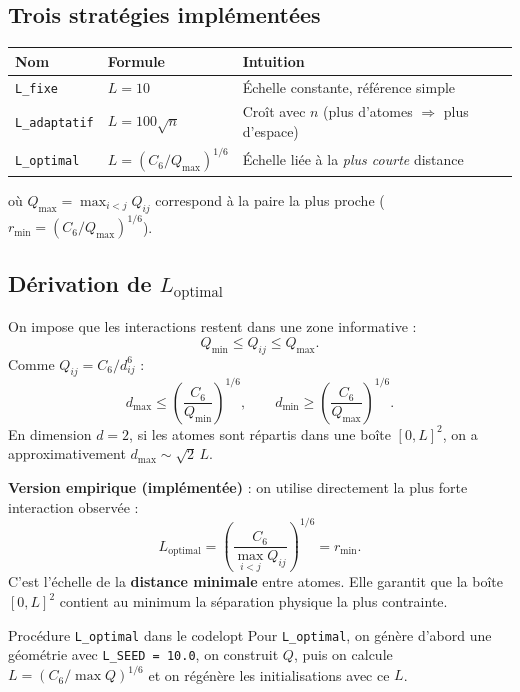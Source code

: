 \documentclass[12pt,a4paper]{article}
\begin{document}
\subsection{Trois stratégies implémentées}

\begin{center}
\begin{tabular}{lll}
  \toprule
  \textbf{Nom} & \textbf{Formule} & \textbf{Intuition} \\
  \midrule
  \texttt{L\_fixe}      & $L = 10$               & Échelle constante, référence simple \\
  \texttt{L\_adaptatif} & $L = 100\sqrt{n}$      & Croît avec $n$ (plus d'atomes $\Rightarrow$ plus d'espace) \\
  \texttt{L\_optimal}   & $L = (C_6/Q_{\max})^{1/6}$ & Échelle liée à la \emph{plus courte} distance \\
  \bottomrule
\end{tabular}
\end{center}

où $Q_{\max} = \max_{i<j} Q_{ij}$ correspond à la paire la plus proche
($r_{\min} = (C_6/Q_{\max})^{1/6}$).

\subsection{Dérivation de $L_{\mathrm{optimal}}$}

On impose que les interactions restent dans une zone informative :
\[
  Q_{\min} \leq Q_{ij} \leq Q_{\max}.
\]
Comme $Q_{ij} = C_6/d_{ij}^6$ :
\[
  d_{\max} \leq \left(\frac{C_6}{Q_{\min}}\right)^{1/6},
  \qquad
  d_{\min} \geq \left(\frac{C_6}{Q_{\max}}\right)^{1/6}.
\]
En dimension $d=2$, si les atomes sont répartis dans une boîte $[0,L]^2$,
on a approximativement $d_{\max} \sim \sqrt{2}\,L$.

\textbf{Version empirique (implémentée)} : on utilise directement la
plus forte interaction observée :
\[
  \boxed{L_{\mathrm{optimal}} = \left(\frac{C_6}{\max_{i<j} Q_{ij}}\right)^{1/6}
  = r_{\min}.}
\]
C'est l'échelle de la \textbf{distance minimale} entre atomes.
Elle garantit que la boîte $[0,L]^2$ contient au minimum la séparation
physique la plus contrainte.

\begin{remarque}{Procédure \texttt{L\_optimal} dans le code}{lopt}
Pour \texttt{L\_optimal}, on génère d'abord une géométrie avec
\texttt{L\_SEED = 10.0}, on construit $Q$, puis on calcule
$L = (C_6/\max Q)^{1/6}$ et on régénère les initialisations avec ce $L$.
\end{remarque}
\end{document}
